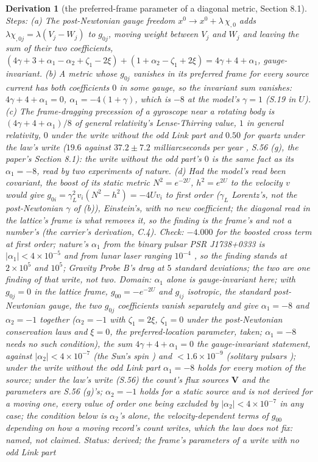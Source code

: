 \documentclass[pdflatex,sn-mathphys-num]{sn-jnl}
\theoremstyle{thmstyleone}
\newtheorem{derivation}{Derivation}
\begin{document}
\begin{derivation}[the preferred-frame parameter of a diagonal metric, Section 8.1]
\emph{Steps:} (a) The post-Newtonian gauge freedom $x^0 \to x^0 + \lambda\,\chi_{,0}$ adds $\lambda\chi_{,0j} = \lambda(V_j - W_j)$ to $g_{0j}$, moving weight between $V_j$ and $W_j$ and leaving the sum of their two coefficients, $(4\gamma + 3 + \alpha_1 - \alpha_2 + \zeta_1 - 2\xi) + (1 + \alpha_2 - \zeta_1 + 2\xi) = 4\gamma + 4 + \alpha_1$, gauge-invariant. (b) A metric whose $g_{0j}$ vanishes in its preferred frame for every source current has both coefficients $0$ in some gauge, so the invariant sum vanishes: $4\gamma + 4 + \alpha_1 = 0$, $\alpha_1 = -4(1 + \gamma)$, which is $-8$ at the model's $\gamma = 1$ (S.19 in $U$). (c) The frame-dragging precession of a gyroscope near a rotating body is $(4\gamma + 4 + \alpha_1) / 8$ of general relativity's Lense-Thirring value, $1$ in general relativity, $0$ under the write without the odd Link part and $0.50$ for quartz under the law's write ($19.6$ against $37.2 \pm 7.2$ milliarcseconds per year \cite{everitt}, S.56 (g), the paper's Section 8.1): the write without the odd part's $0$ is the same fact as its $\alpha_1 = -8$, read by two experiments of nature. (d) Had the model's read been covariant, the boost of its static metric $N^2 = e^{-2U}$, $h^2 = e^{2U}$ to the velocity $v$ would give $g_{0i} = \gamma_L^2 v_i (N^2 - h^2) = -4Uv_i$ to first order ($\gamma_L$ Lorentz's, not the post-Newtonian $\gamma$ of (b)), Einstein's, with no new coefficient; the diagonal read in the lattice's frame is what removes it, so the finding is the frame's and not a number's (the carrier's derivation, C.4). \emph{Check:} $-4.000$ for the boosted cross term at first order; nature's $\alpha_1$ from the binary pulsar PSR J1738+0333 is $|\alpha_1| < 4 \times 10^{-5}$ \cite{shao} and from lunar laser ranging $10^{-4}$ \cite{muller}, so the finding stands at $2 \times 10^5$ and $10^5$; Gravity Probe B's drag at $5$ standard deviations; the two are one finding of that write, not two. \emph{Domain:} $\alpha_1$ alone is gauge-invariant here; with $g_{0j} = 0$ in the lattice frame, $g_{00} = -e^{-2U}$ and $g_{ij}$ isotropic, the standard post-Newtonian gauge, the two $g_{0j}$ coefficients vanish separately and give $\alpha_1 = -8$ and $\alpha_2 = -1$ together ($\alpha_2 = -1$ with $\zeta_1 = 2\xi$, $\zeta_1 = 0$ under the post-Newtonian conservation laws and $\xi = 0$, the preferred-location parameter, taken; $\alpha_1 = -8$ needs no such condition), the sum $4\gamma + 4 + \alpha_1 = 0$ the gauge-invariant statement, against $|\alpha_2| < 4 \times 10^{-7}$ (the Sun's spin \cite{nordtvedt}) and $< 1.6 \times 10^{-9}$ (solitary pulsars \cite{shao2013}); under the write without the odd Link part $\alpha_1 = -8$ holds for every motion of the source; under the law's write (S.56) the count's flux sources $\mathbf V$ and the parameters are S.56 (g)'s; $\alpha_2 = -1$ holds for a static source and is not derived for a moving one, every value of order one being excluded by $|\alpha_2| < 4 \times 10^{-7}$ in any case; the condition below is $\alpha_2$'s alone, the velocity-dependent terms of $g_{00}$ depending on how a moving record's count writes, which the law does not fix: named, not claimed. \emph{Status:} derived; the frame's parameters of a write with no odd Link part 
\end{derivation}
\end{document}
